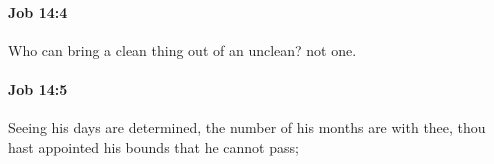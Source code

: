 		\paragraph{Job 14:4} %
			\label{JOB-14-4}

			Who can bring a clean thing out of an unclean? not one.


		\paragraph{Job 14:5} %
			\label{JOB-14-5}

			Seeing his days are determined, the number of his months are with thee, thou hast appointed his bounds that he cannot pass;


